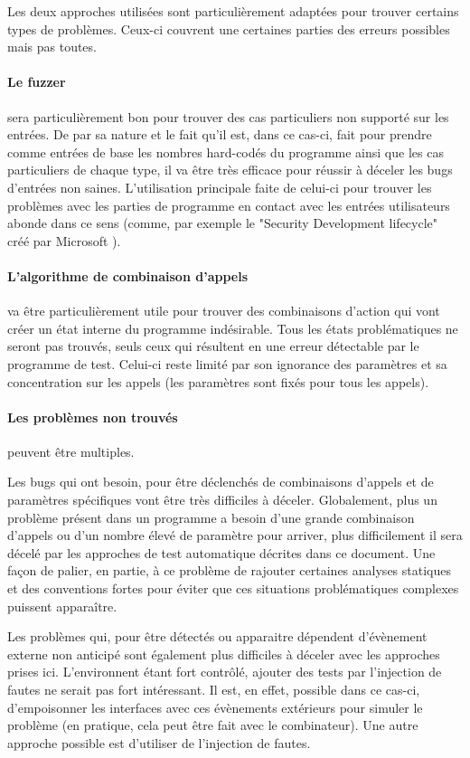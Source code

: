 \documentclass[a4paper]{report}
\begin{document}
Les deux approches utilisées sont particulièrement adaptées pour trouver certains types de problèmes.
Ceux-ci couvrent une certaines parties des erreurs possibles mais pas toutes.

\paragraph{Le fuzzer} sera particulièrement bon pour trouver des cas particuliers non supporté sur les entrées.
De par sa nature et le fait qu'il est, dans ce cas-ci, fait pour prendre comme entrées de base les nombres hard-codés du programme ainsi que les cas particuliers de chaque type, il va être très efficace pour réussir à déceler les bugs d'entrées non saines.
L'utilisation principale faite de celui-ci pour trouver les problèmes avec les parties de programme en contact avec les entrées utilisateurs abonde dans ce sens (comme, par exemple le "Security Development lifecycle" créé par Microsoft \cite{howard2006security}).

\paragraph{L'algorithme de combinaison d'appels} va être particulièrement utile pour trouver des combinaisons d'action qui vont créer un état interne du programme indésirable.
Tous les états problématiques ne seront pas trouvés, seuls ceux qui résultent en une erreur détectable par le programme de test.
Celui-ci reste limité par son ignorance des paramètres et sa concentration sur les appels (les paramètres sont fixés pour tous les appels).

\paragraph{Les problèmes non trouvés} peuvent être multiples.

Les bugs qui ont besoin, pour être déclenchés de combinaisons d'appels et de paramètres spécifiques vont être très difficiles à déceler.
Globalement, plus un problème présent dans un programme a besoin d'une grande combinaison d'appels ou d'un nombre élevé de paramètre pour arriver, plus difficilement il sera décelé par les approches de test automatique décrites dans ce document.
Une façon de palier, en partie, à ce problème de rajouter certaines analyses statiques et des conventions fortes pour éviter que ces situations problématiques complexes puissent apparaître.

Les problèmes qui, pour être détectés ou apparaitre dépendent d'évènement externe non anticipé sont également plus difficiles à déceler avec les approches prises ici.
L'environnent étant fort contrôlé, ajouter des tests par l'injection de fautes ne serait pas fort intéressant.
Il est, en effet, possible dans ce cas-ci, d'empoisonner les interfaces avec ces évènements extérieurs pour simuler le problème (en pratique, cela peut être fait avec le combinateur).
Une autre approche possible est d'utiliser de l'injection de fautes.
\end{document}
